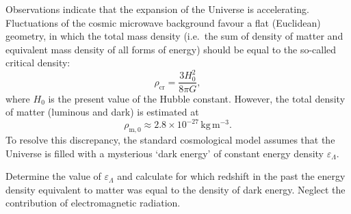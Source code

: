 Observations indicate that the expansion of the Universe is accelerating.
Fluctuations of the cosmic microwave background favour a flat (Euclidean)
geometry, in which the total mass density (i.e.\ the sum of density of matter
and equivalent mass density of all forms of energy) should be equal to the
so-called critical density:
\[ \rho_{\mathrm{cr}} = \frac{3H_0^2}{8\pi G}, \]
where $H_0$ is the present value of the Hubble constant. However, the total
density of matter (luminous and dark) is estimated at
\[ \rho_{\mathrm{m},0} \approx 2.8 \times 10^{-27}\,\mathrm{kg\,m^{-3}}. \]
To resolve this discrepancy, the standard cosmological model assumes that the
Universe is filled with a mysterious `dark energy' of constant energy density
$\varepsilon_\Lambda$.

Determine the value of $\varepsilon_\Lambda$ and calculate for which redshift
in the past the energy density equivalent to matter was equal to the density
of dark energy. Neglect the contribution of electromagnetic radiation.

